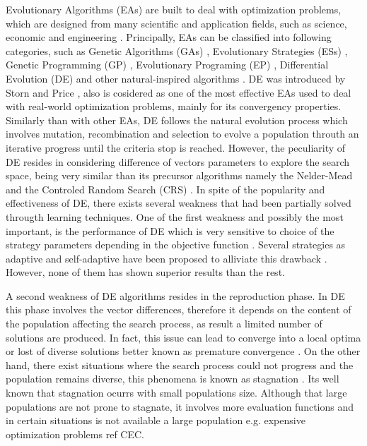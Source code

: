 Evolutionary Algorithms (EAs) are built to deal with optimization problems, which are designed from many scientific and application fields, such as science, economic and engineering \cite{noman2008differential, chakraborty2008advances}.
%
Principally, EAs can be classified into following categories, such as Genetic Algorithms (GAs) \cite{srinivas1994genetic, schwefel1977numerische} , Evolutionary Strategies (ESs) \cite{john1992holland}, Genetic Programming (GP) \cite{koza1992genetic}, Evolutionary Programing (EP) \cite{fogel1991meta}, Differential Evolution (DE) \cite{storn1997differential} and other natural-inspired algorithms \cite{das2011differential}.
%
%
DE was introduced by Storn and Price \cite{storn1997differential}, also is cosidered as one of the most effective EAs used to deal with real-world optimization problems, mainly for its convergency properties.
%
Similarly than with other EAs, DE follows the natural evolution process which involves mutation, recombination and selection to evolve a population throuth an iterative progress until the criteria stop is reached.
%
However, the peculiarity of DE resides in considering difference of vectors parameters to explore the search space, being very similar than its precursor algorithms namely the Nelder-Mead \cite{nelder1965simplex} and the Controled Random Search (CRS) \cite{price1983global}.
%
In spite of the popularity and effectiveness of DE, there exists several weakness that had been partially solved througth learning techniques.
%
One of the first weakness and possibly the most important, is the performance of DE which is very sensitive to choice of the strategy parameters depending in the objective function \cite{gamperle2002parameter}.
%
Several strategies as adaptive and self-adaptive have been proposed to alliviate this drawback \cite{brest2006self, zhang2009jade}.
%
However, none of them has shown superior results than the rest.
%

A second weakness of DE algorithms resides in the reproduction phase.
%
In DE this phase involves the vector differences, therefore it depends on the content of the population affecting the search process, as result a limited number of solutions are produced.
%
In fact, this issue can lead to converge into a local optima or lost of diverse solutions better known as premature convergence \cite{sa2008exploration}.
%
On the other hand, there exist situations where the search process could not progress and the population remains diverse, this phenomena is known as stagnation \cite{lampinen2000stagnation}.
%
Its well known that stagnation ocurrs with small populations size.
%
Although that large populations are not prone to stagnate, it involves more evaluation functions and in certain situations is not available a large population e.g. expensive optimization problems ref CEC.

